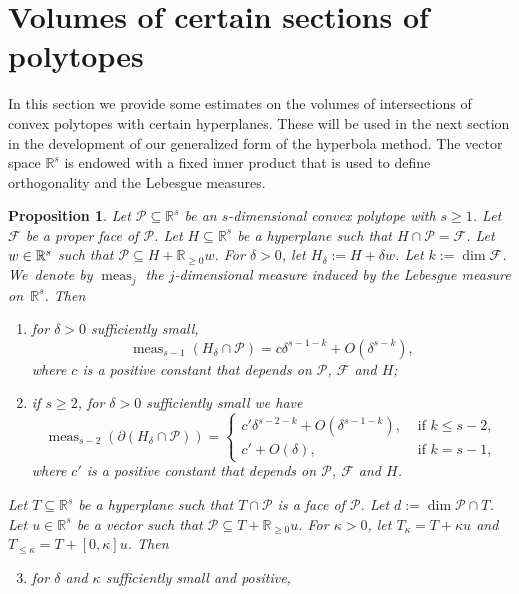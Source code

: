\documentclass[11pt]{article}
\numberwithin{equation}{section}
\newenvironment{enumeratei}
{\bgroup\def\theenumi{\roman{enumi}}\def\theenumii{\arabic{enumii}}\begin{enumerate}}
{\end{enumerate}\egroup}
\newcommand\RR{\mathbb{R}}
\DeclareMathOperator{\meas}{meas}
\newtheorem{prop}[theorem]{Proposition}
\theoremstyle{definition}
\numberwithin{theorem}{section}
\begin{document}
\section{Volumes of certain sections of polytopes}
\label{sec:volume_section_polytope}
In this section we provide some estimates on the volumes of intersections
of convex polytopes with certain hyperplanes.
These will be used in the next section in the development of our generalized form of the hyperbola method.
The vector space $\RR^s$ is endowed with a fixed inner product that is used to define orthogonality and the Lebesgue measures.

\begin{prop}
\label{prop:volume_section_polytope}
Let $\mathcal P\subseteq \RR^s$ be an $s$-dimensional convex polytope with $s\geq1$.
Let~$\mathcal F$ be a proper face of $\mathcal P$.
Let $H\subseteq\RR^s$ be a hyperplane such that $H\cap \mathcal P=\mathcal F$.
Let~$w\in\nobreak\RR^s$ such that $\mathcal P\subseteq H+\RR_{\geq0}w$.
For $\delta> 0$, let $H_\delta:=H+\delta w$. Let $k:=\dim \mathcal F$.
We~denote by $\meas_j$ the $j$-dimensional measure
induced by the Lebesgue measure on~$\RR^s$. Then
\begin{enumeratei}
\item
\label{item:volume_s-1}
for $\delta>0$ sufficiently small,
\[
\meas_{s-1} (H_\delta \cap \mathcal P)=
c \delta^{s-1-k}+O(\delta^{s-k}),
\]
where $c$ is a positive constant that depends on $\mathcal P$, $\mathcal F$ and $H$;
\item
\label{item:volume_boundary}
if $s\geq 2$, for $\delta>0$ sufficiently small we have
\[
\meas_{s-2} (\partial(H_\delta \cap \mathcal P))= \begin{cases}
c' \delta^{s-2-k}+O(\delta^{s-1-k}), & \text{ if } k\leq s-2,\\
c' +O(\delta), & \text{ if } k= s-1,
\end{cases}
\]
where $c'$ is a positive constant that depends on $\mathcal P$, $\mathcal F$ and $H$.
\end{enumeratei}
Let $T\subseteq \RR^s$ be a hyperplane such that $T\cap \mathcal P$ is a face of $\mathcal P$. Let $d:=\dim\mathcal P\cap T$.
Let $u\in\RR^s$ be a vector such that $\mathcal P\subseteq T+\RR_{\geq0}u$.
For $\kappa>0$, let $T_\kappa=T+{\kappa}u$ and $T_{\leq\kappa}=T+[0,\kappa] u$. Then
\begin{enumeratei}\setcounter{enumi}{2}
\item
\label{item:volume_s-1_kappa}
for $\delta$ and $\kappa$ sufficiently small and positive,
\[
\]
\end{enumeratei}
\end{prop}
\end{document}
